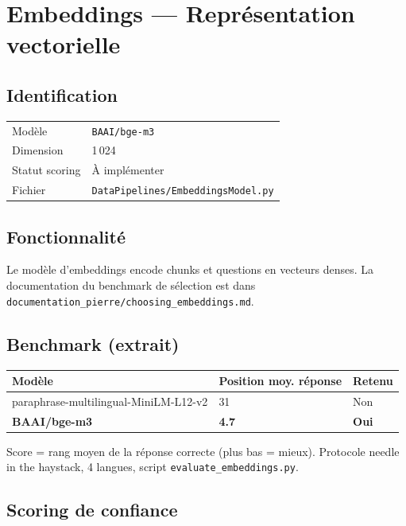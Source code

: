 \chapter{Embeddings --- Représentation vectorielle}

\section{Identification}

\begin{center}
\begin{tabular}{ll}
\toprule
Modèle         & \texttt{BAAI/bge-m3} \\
Dimension      & 1\,024 \\
Statut scoring & À implémenter \\
Fichier        & \texttt{DataPipelines/EmbeddingsModel.py} \\
\bottomrule
\end{tabular}
\end{center}

\section{Fonctionnalité}

Le modèle d'embeddings encode chunks et questions en vecteurs denses.
La documentation du benchmark de sélection est dans
\texttt{documentation\_pierre/choosing\_embeddings.md}.

\section{Benchmark (extrait)}

\begin{center}
\begin{tabular}{lll}
\toprule
\textbf{Modèle} & \textbf{Position moy. réponse} & \textbf{Retenu} \\
\midrule
paraphrase-multilingual-MiniLM-L12-v2 & 31    & Non \\
\textbf{BAAI/bge-m3}                  & \textbf{4.7} & \textbf{Oui} \\
\bottomrule
\end{tabular}
\end{center}

\noindent Score = rang moyen de la réponse correcte (plus bas = mieux).
Protocole \og needle in the haystack\fg{}, 4 langues, script
\texttt{evaluate\_embeddings.py}.

\section{Scoring de confiance}

